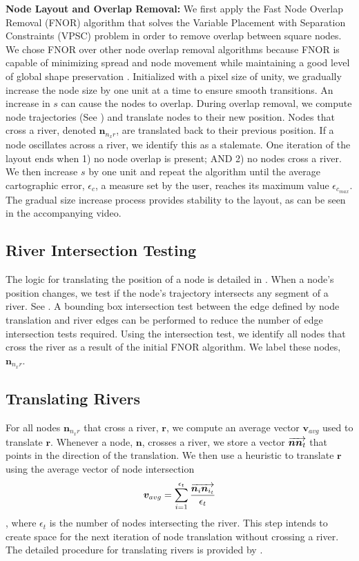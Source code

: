 \documentclass[Afour,sagev,times]{sagej}
\newcommand{\bobgraph}[1]{\noindent\textbf{#1}}
\newcommand{\Vector}[1]{\protect\overrightarrow{#1}}
\newcommand{\nodeSize}{s}
\newcommand{\nodeError}{\epsilon}
\newcommand{\nodeCartographicError}{\nodeError_{c}}
\newcommand{\nodeCartographicErrorMax}{\nodeError_{c_{max}}}
\newcommand{\nodeTopologicalError}{\nodeError_{t}}
\newcommand{\node}{\bm{n}}
\newcommand{\river}{\bm{r}}
\newcommand{\nodeVectorNNn}{\Vector{\node\node_{t}}}
\newcommand{\vectorAvg}{\bm{v}_{avg}}
\newcommand{\NxR}{\node_{n_{x}r}}
\begin{document}
\bobgraph{Node Layout and Overlap Removal:} We first apply the Fast Node Overlap Removal (FNOR) algorithm that solves the Variable Placement with Separation Constraints (VPSC) problem \cite{dwyer2006Fast} in order to remove overlap between square nodes.
We chose FNOR over other node overlap removal algorithms because FNOR is capable of minimizing spread and node movement while maintaining a good level of global shape preservation \cite{chen2020Node}.
Initialized with a pixel size of unity, we gradually increase the node size by one unit at a time to ensure smooth transitions.
An increase in $ \nodeSize $ can cause the nodes to overlap.
During overlap removal, we compute node trajectories (See ) and translate nodes to their new position.
Nodes that cross a river, denoted $ \NxR $, are translated back to their previous position.
If a node oscillates across a river, we identify this as a stalemate.
One iteration of the layout ends when 1) no node overlap is present; AND 2) no nodes cross a river.
We then increase $ \nodeSize $ by one unit and repeat the algorithm until the average cartographic error, $ \nodeCartographicError $, a measure set by the user, reaches its maximum value $ \nodeCartographicErrorMax $.
The gradual size increase process provides stability to the layout, as can be seen in the accompanying video.

\subsection{River Intersection Testing}
\label{subsec:{River Intersection Testing}}

The logic for translating the position of a node is detailed in .
When a node's position changes, we test if the node's trajectory intersects any segment of a river.
See .
A bounding box intersection test between the edge defined by node translation and river edges can be performed to reduce the number of edge intersection tests required.
Using the intersection test, we identify all nodes that cross the river as a result of the initial FNOR algorithm.
We label these nodes, $ \NxR $.

\subsection{Translating Rivers}
\label{subsec:{Translating Rivers}}

For all nodes $ \NxR $ that cross a river, $ \river $, we compute an average vector $ \vectorAvg $ used to translate $ \river $.
Whenever a node, $ \node $, crosses a river, we store a vector $ \nodeVectorNNn $ that points in the direction of the translation.
We then use a heuristic to translate $ \river $ using the average vector of node intersection $$ \vectorAvg = \sum_{i=1}^{\nodeTopologicalError} \frac{\Vector{\node_i\node_{i_t}}}{\nodeTopologicalError} $$, where $ \nodeTopologicalError $ is the number of nodes intersecting the river.
This step intends to create space for the next iteration of node translation without crossing a river.
The detailed procedure for translating rivers is provided by .
\end{document}
